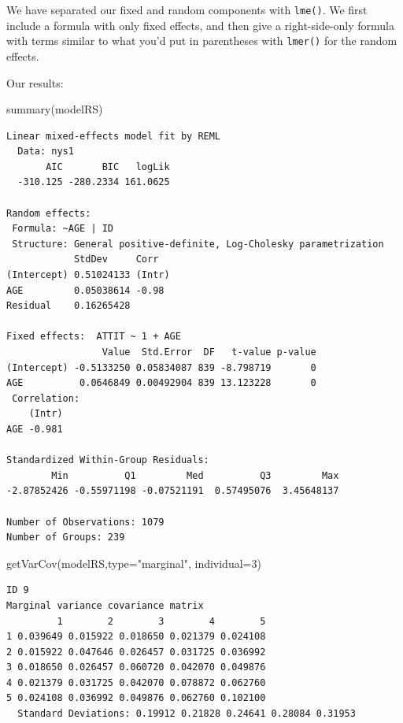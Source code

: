 \documentclass[
  letterpaper,
  DIV=11,
  numbers=noendperiod]{scrreprt}
\newenvironment{Shaded}{\begin{snugshade}}{\end{snugshade}}
\newcommand{\AttributeTok}[1]{\textcolor[rgb]{0.49,0.56,0.16}{#1}}
\newcommand{\DecValTok}[1]{\textcolor[rgb]{0.25,0.63,0.44}{#1}}
\newcommand{\FunctionTok}[1]{\textcolor[rgb]{0.02,0.16,0.49}{#1}}
\newcommand{\NormalTok}[1]{\textcolor[rgb]{0.00,0.44,0.13}{#1}}
\newcommand{\StringTok}[1]{\textcolor[rgb]{0.25,0.44,0.63}{#1}}
\begin{document}
We have separated our fixed and random components with \texttt{lme()}.
We first include a formula with only fixed effects, and then give a
right-side-only formula with terms similar to what you'd put in
parentheses with \texttt{lmer()} for the random effects.

Our results:

\begin{Shaded}
\begin{Highlighting}[]
\FunctionTok{summary}\NormalTok{(modelRS)}
\end{Highlighting}
\end{Shaded}

\begin{verbatim}
Linear mixed-effects model fit by REML
  Data: nys1 
       AIC       BIC   logLik
  -310.125 -280.2334 161.0625

Random effects:
 Formula: ~AGE | ID
 Structure: General positive-definite, Log-Cholesky parametrization
            StdDev     Corr  
(Intercept) 0.51024133 (Intr)
AGE         0.05038614 -0.98 
Residual    0.16265428       

Fixed effects:  ATTIT ~ 1 + AGE 
                 Value  Std.Error  DF   t-value p-value
(Intercept) -0.5133250 0.05834087 839 -8.798719       0
AGE          0.0646849 0.00492904 839 13.123228       0
 Correlation: 
    (Intr)
AGE -0.981

Standardized Within-Group Residuals:
        Min          Q1         Med          Q3         Max 
-2.87852426 -0.55971198 -0.07521191  0.57495076  3.45648137 

Number of Observations: 1079
Number of Groups: 239 
\end{verbatim}

\begin{Shaded}
\begin{Highlighting}[]
\FunctionTok{getVarCov}\NormalTok{(modelRS,}\AttributeTok{type=}\StringTok{"marginal"}\NormalTok{, }\AttributeTok{individual=}\DecValTok{3}\NormalTok{)}
\end{Highlighting}
\end{Shaded}

\begin{verbatim}
ID 9 
Marginal variance covariance matrix
         1        2        3        4        5
1 0.039649 0.015922 0.018650 0.021379 0.024108
2 0.015922 0.047646 0.026457 0.031725 0.036992
3 0.018650 0.026457 0.060720 0.042070 0.049876
4 0.021379 0.031725 0.042070 0.078872 0.062760
5 0.024108 0.036992 0.049876 0.062760 0.102100
  Standard Deviations: 0.19912 0.21828 0.24641 0.28084 0.31953 
\end{verbatim}
\end{document}
